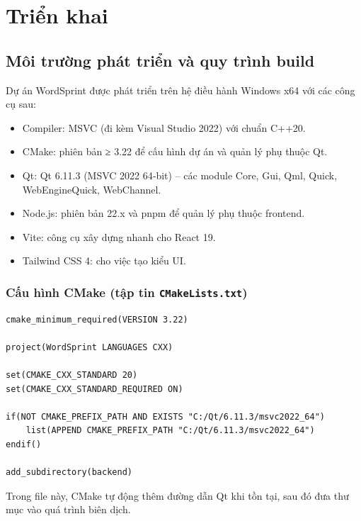 
\chapter{Triển khai}
\label{chap:implementation}

\section{Môi trường phát triển và quy trình build}
\label{sec:build_environment}
Dự án WordSprint được phát triển trên hệ điều hành Windows x64 với các công cụ sau:
\begin{itemize}
    \item Compiler: MSVC (đi kèm Visual Studio 2022) với chuẩn C++20.
    \item CMake: phiên bản ≥ 3.22 để cấu hình dự án và quản lý phụ thuộc Qt.
    \item Qt: Qt 6.11.3 (MSVC 2022 64‑bit) – các module Core, Gui, Qml, Quick, WebEngineQuick, WebChannel.
    \item Node.js: phiên bản 22.x và pnpm để quản lý phụ thuộc frontend.
    \item Vite: công cụ xây dựng nhanh cho React 19.
    \item Tailwind CSS 4: cho việc tạo kiểu UI.
\end{itemize}

\subsection{Cấu hình CMake (tập tin \texttt{CMakeLists.txt})}
\label{subsec:cmake}
\begin{lstlisting}[caption={CMakeLists.txt tại gốc dự án}, label={lst:cmake_root}]
cmake_minimum_required(VERSION 3.22)

project(WordSprint LANGUAGES CXX)

set(CMAKE_CXX_STANDARD 20)
set(CMAKE_CXX_STANDARD_REQUIRED ON)

if(NOT CMAKE_PREFIX_PATH AND EXISTS "C:/Qt/6.11.3/msvc2022_64")
    list(APPEND CMAKE_PREFIX_PATH "C:/Qt/6.11.3/msvc2022_64")
endif()

add_subdirectory(backend)
\end{lstlisting}
Trong file này, CMake tự động thêm đường dẫn Qt khi tồn tại, sau đó đưa thư mục  vào quá trình biên dịch.

